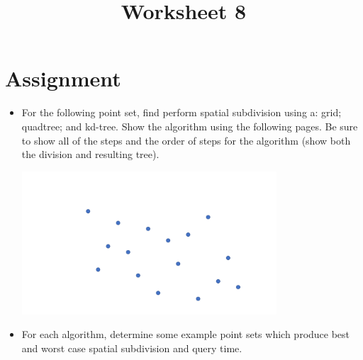 \documentclass[a4paper,12pt]{article}
\title{Worksheet 8}
\begin{document}
\maketitle

\worksheetGroundRules


\vspace{5pt}
\section{Assignment}

\begin{itemize}



\item For the following point set, find perform spatial subdivision using a: grid; quadtree; and kd-tree. Show the algorithm using the following pages. Be sure to show all of the steps and the order of steps for the algorithm (show both the division and resulting tree).

\begin{center}
\includegraphics[width=9.5cm]{../images/spatial_subd.pdf}
\end{center}


\item For each algorithm, determine some example point sets which produce best and worst case spatial subdivision and query time.


\end{itemize}


\worksheetSubmission




\newpage
\end{document}
